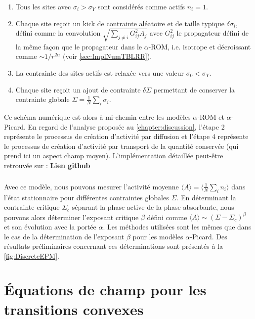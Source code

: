 \begin{enumerate}
	\item Tous les sites avec $\sigma_i > \sigma_Y$ sont considérés comme actifs $n_i=1$.
	\item Chaque site reçoit un kick de contrainte aléatoire et de taille typique $\delta\sigma_i$, défini comme la convolution $\sqrt{\sum_{j\neq i}G_{ij}^2A_j}$ avec $G_{ij}^2$ le propagateur défini de la même façon que le propagateur dans le $\alpha$-ROM, i.e. isotrope et décroissant comme $\sim 1/r^{2\alpha}$ (voir \autoref{sec:ImplNumTBLRR}).
	\item La contrainte des sites actifs est relaxée vers une valeur $\sigma_0 < \sigma_Y$.
	\item Chaque site reçoit un ajout de contrainte $\delta\Sigma$ permettant de conserver la contrainte globale $\Sigma = \frac{1}{N}\sum_{i}\sigma_i$.
\end{enumerate}

\noindent Ce schéma numérique est alors à mi-chemin entre les modèles $\alpha$-ROM et $\alpha$-Picard. En regard de l'analyse proposée au \autoref{chapter:discussion}, l'étape 2 représente le processus de création d'activité par diffusion et l'étape 4 représente le processus de création d'activité par transport de la quantité conservée (qui prend ici un aspect champ moyen). L'implémentation détaillée peut-être retrouvée sur : \textbf{Lien github}

\subparagraph{}Avec ce modèle, nous pouvons mesurer l'activité moyenne $\langle A \rangle = \langle \frac{1}{N}\sum_{i}n_i \rangle $ dans l'état stationnaire pour différentes contraintes globales $\Sigma$. En déterminant la contrainte critique $\Sigma_c$ séparant la phase active de la phase absorbante, nous pouvons alors déterminer l'exposant critique $\beta$ défini comme $\langle A \rangle \sim (\Sigma - \Sigma_c)^\beta$ et son évolution avec la portée $\alpha$. Les méthodes utilisées sont les mêmes que dans le cas de la détermination de l'exposant $\beta$ pour les modèles $\alpha$-Picard. Des résultats préliminaires concernant ces déterminations sont présentés à la \autoref{fig:DiscreteEPM}.

\FloatBarrier

\section{Équations de champ pour les transitions convexes}

\label{sec:eqchampconvexe}

